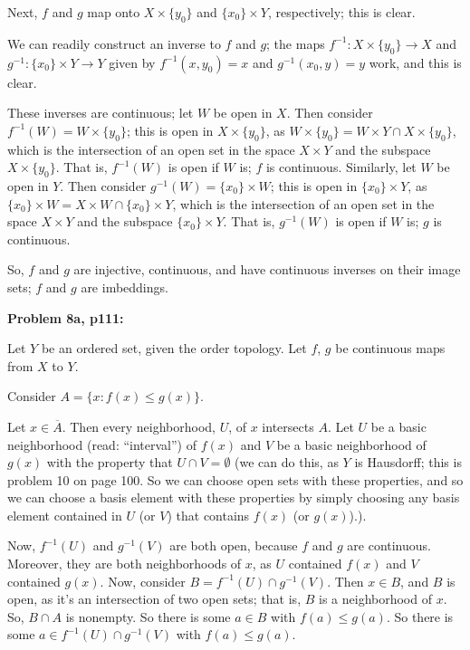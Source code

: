 \documentclass[a4paper,12pt]{article}
\begin{document}
Next, $f$ and $g$ map onto $X \times \{y_0\}$ and $\{x_0\} \times Y$, respectively; this is clear. %

We can readily construct an inverse to $f$ and $g$; the maps $f^{-1}: X \times \{y_0\} \to X$ and $g^{-1}: \{x_0\} \times Y \to Y$ given by $f^{-1}(x,y_0) = x$ and $g^{-1}(x_0,y) = y$ work, and this is clear.

These inverses are continuous; let $W$ be open in $X$. Then consider $f^{-1}(W) = W \times \{y_0\}$; this is open in $X \times \{y_0\}$, as $W \times \{y_0\} = W \times Y \cap X \times \{y_0\}$, which is the intersection of an open set in the space $X \times Y$ and the subspace $X \times \{y_0\}$. That is, $f^{-1}(W)$ is open if $W$ is; $f$ is continuous. Similarly, let $W$ be open in $Y$. Then consider $g^{-1}(W) = \{x_0\} \times W$; this is open in $\{x_0\} \times Y$, as $\{x_0\} \times W = X \times W \cap \{x_0\} \times Y$, which is the intersection of an open set in the space $X \times Y$ and the subspace $\{x_0\} \times Y$. That is, $g^{-1}(W)$ is open if $W$ is; $g$ is continuous.

So, $f$ and $g$ are injective, continuous, and have continuous inverses on their image sets; $f$ and $g$ are imbeddings. 


\shunt

{\bf Problem 8a, p111:}

Let $Y$ be an ordered set, given the order topology. Let $f$, $g$ be continuous maps from $X$ to $Y$.

Consider $A = \{x: f(x) \leq g(x)\}$.

Let $x \in \overline{A}$. Then every neighborhood, $U$, of $x$ intersects $A$. Let $U$ be a basic neighborhood (read: ``interval'') of $f(x)$ and $V$ be a basic neighborhood of $g(x)$ with the property that $U \cap V = \emptyset$ (we can do this, as $Y$ is Hausdorff; this is problem 10 on page 100. So we can choose open sets with these properties, and so we can choose a basis element with these properties by simply choosing any basis element contained in $U$ (or $V$) that contains $f(x)$ (or $g(x)$).). 

Now, $f^{-1}(U)$ and $g^{-1}(V)$ are both open, because $f$ and $g$ are continuous. Moreover, they are both neighborhoods of $x$, as $U$ contained $f(x)$ and $V$ contained $g(x)$. Now, consider $B = f^{-1}(U) \cap g^{-1}(V)$. Then $x \in B$, and $B$ is open, as it's an intersection of two open sets; that is, $B$ is a neighborhood of $x$. So, $B \cap A$ is nonempty. So there is some $a \in B$ with $f(a) \leq g(a)$. So there is some $a \in f^{-1}(U) \cap g^{-1}(V)$ with $f(a) \leq g(a)$. 
\end{document}
